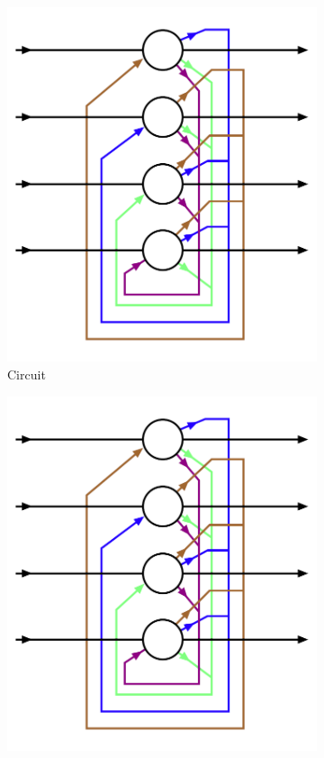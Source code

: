 \documentclass[11pt]{article}
\begin{document}
	\begin{figure}[h]
	\begin{center}
	\begin{subfigure}{0.4\textwidth}
	\includegraphics[width=0.95\linewidth]{../img/hopfieldnet.png}
	\caption{Circuit}
	\label{fig:netcircuit}
	\end{subfigure}
	\begin{subfigure}{0.4\textwidth}
	\includegraphics[width=0.95\linewidth]{../img/hopfieldnet.png}

\end{subfigure}
\end{center}
\end{figure}
\end{document}
